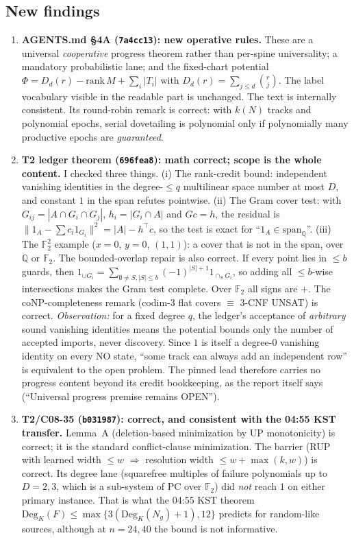 \documentclass[11pt]{article}
\theoremstyle{definition}
\newcommand{\Deg}{\mathrm{Deg}}
\begin{document}
\subsection*{New findings}
\begin{enumerate}
\item \textbf{AGENTS.md \S4A (\texttt{7a4cc13}): new operative rules.} These are a universal \emph{cooperative} progress theorem rather than per-spine universality; a mandatory probabilistic lane; and the fixed-chart potential $\Phi=D_d(r)-\mathrm{rank}\,M+\sum_i|T_i|$ with $D_d(r)=\sum_{j\le d}\binom rj$. The label vocabulary visible in the readable part is unchanged. The text is internally consistent. Its round-robin remark is correct: with $k(N)$ tracks and polynomial epochs, serial dovetailing is polynomial only if polynomially many productive epochs are \emph{guaranteed}.
\item \textbf{T2 ledger theorem (\texttt{696fea8}): math correct; scope is the whole content.} I checked three things. (i) The rank-credit bound: independent vanishing identities in the degree-$\le q$ multilinear space number at most $D$, and constant $1$ in the span refutes pointwise. (ii) The Gram cover test: with $G_{ij}=|A\cap G_i\cap G_j|$, $h_i=|G_i\cap A|$ and $Gc=h$, the residual is $\|1_A-\sum c_i1_{G_i}\|^2=|A|-h^{\top}c$, so the test is exact for ``$1_A\in\mathrm{span}_{\mathbb Q}$''. (iii) The $\mathbb F_2^2$ example ($x{=}0$, $y{=}0$, $(1,1)$): a cover that is not in the span, over $\mathbb Q$ or $\mathbb F_2$. The bounded-overlap repair is also correct. If every point lies in $\le b$ guards, then $1_{\cup G_i}=\sum_{\emptyset\ne S,|S|\le b}(-1)^{|S|+1}1_{\cap_S G_i}$, so adding all $\le b$-wise intersections makes the Gram test complete. Over $\mathbb F_2$ all signs are $+$. The coNP-completeness remark (codim-3 flat covers $\equiv$ 3-CNF UNSAT) is correct. \emph{Observation:} for a fixed degree $q$, the ledger's acceptance of \emph{arbitrary} sound vanishing identities means the potential bounds only the number of accepted imports, never discovery. Since $1$ is itself a degree-0 vanishing identity on every NO state, ``some track can always add an independent row'' is equivalent to the open problem. The pinned lead therefore carries no progress content beyond its credit bookkeeping, as the report itself says (``Universal progress premise remains OPEN'').
\item \textbf{T2/C08-35 (\texttt{b031987}): correct, and consistent with the 04:55 KST transfer.} Lemma~A (deletion-based minimization by UP monotonicity) is correct; it is the standard conflict-clause minimization. The barrier (RUP with learned width $\le w$ $\Rightarrow$ resolution width $\le w+\max(k,w)$) is correct. Its degree lane (squarefree multiples of failure polynomials up to $D=2,3$, which is a sub-system of PC over $\mathbb F_2$) did \emph{not} reach $1$ on either primary instance. That is what the 04:55 KST theorem $\Deg_K(F)\le\max\{3(\Deg_K(N_g)+1),12\}$ predicts for random-like sources, although at $n=24,40$ the bound is not informative.

\end{enumerate}
\end{document}
